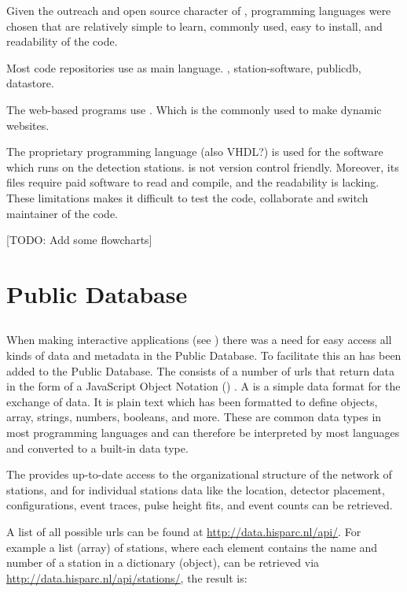 Given the outreach and open source character of \hisparc, programming languages were chosen that are relatively simple to learn, commonly used, easy to install, and readability of the code.

Most code repositories use \python as main language.
\sapphire, station-software, publicdb, datastore.

The web-based programs use \javascript. Which is the commonly used to make dynamic websites.

The proprietary programming language \labview (also VHDL?) is used for the  \daq software which runs on the detection stations. \labview is not version control friendly. Moreover, its files require paid software to read and compile, and the readability is lacking. These limitations makes it difficult to test the code, collaborate and switch maintainer of the code.


[TODO: Add some flowcharts]


\section{\hisparc Public Database}

\subsection{\api}

When making interactive applications (see \jsparc) there was a need for easy access all kinds of data and metadata in the Public Database. To facilitate this an \api has been added to the Public Database. The \api consists of a number of urls that return data in the form of a JavaScript Object Notation (\json) \cite{rfc7159}. A \json is a simple data format for the exchange of data. It is plain text which has been formatted to define objects, array, strings, numbers, booleans, and more. These are common data types in most programming languages and can therefore be interpreted by most languages and converted to a built-in data type.

The \api provides up-to-date access to the organizational structure of the \hisparc network of stations, and for individual stations data like the \gps location, detector placement, configurations, event traces, pulse height fits, and event counts can be retrieved.

A list of all possible urls can be found at \url{http://data.hisparc.nl/api/}. For example a list (array) of \hisparc stations, where each element contains the name and number of a station in a dictionary (object), can be retrieved via \url{http://data.hisparc.nl/api/stations/}, the result is:

